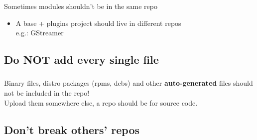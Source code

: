 \begin{frame}
  \begin{center}
    \textbf{\Huge{\insertsubsection}}
  \end{center}
\end{frame}


\begin{frame}
  \frametitle{\insertsubsection}

  Sometimes modules shouldn't be in the same repo\\

  \begin{itemize}
    \item A base + plugins project should live in different repos\\
      e.g.: GStreamer
  \end{itemize}

\end{frame}


\subsection{Do NOT add every single file}

\begin{frame}
  \begin{center}
    \textbf{\Huge{\insertsubsection}}
  \end{center}
\end{frame}


\begin{frame}
  \frametitle{\insertsubsection}

  Binary files, distro packages (rpms, debs) and other \textbf{auto-generated} files should not be
  included in the repo!\\Upload them somewhere else, a repo should be for source code.

\end{frame}


\subsection{Don't break others' repos}

\begin{frame}
  \begin{center}
    \textbf{\Huge{\insertsubsection}}
  \end{center}
\end{frame}

